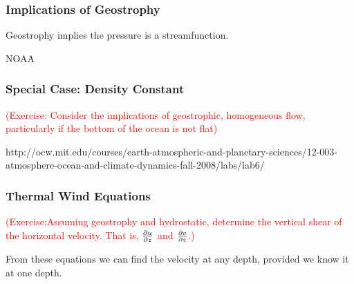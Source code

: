 \documentclass[xcolor=dvipsnames]{beamer}
\begin{document}
\begin{frame}
\frametitle{Implications of Geostrophy}
\label{ssh_image}

Geostrophy implies the pressure is a streamfunction.

NOAA

\end{frame}

\begin{frame}
\frametitle{Special Case: Density Constant}

\textcolor{red}{(Exercise: Consider the implications of geostrophic, homogeneous flow, particularly if the bottom of the ocean is not flat)}
\end{frame}

\begin{frame}
http://ocw.mit.edu/courses/earth-atmospheric-and-planetary-sciences/12-003-atmosphere-ocean-and-climate-dynamics-fall-2008/labs/lab6/
\end{frame}

\begin{frame}
\frametitle{Thermal Wind Equations}
\textcolor{red}{(Exercise:Assuming geostrophy and hydrostatic, determine the vertical shear of the horizontal velocity.  That is, $\frac {\partial u}{\partial z}$ and $\frac {\partial v}{\partial z}$.)}

From these equations we can find the velocity at any depth, provided we know it at one depth.
\end{frame}
\end{document}
